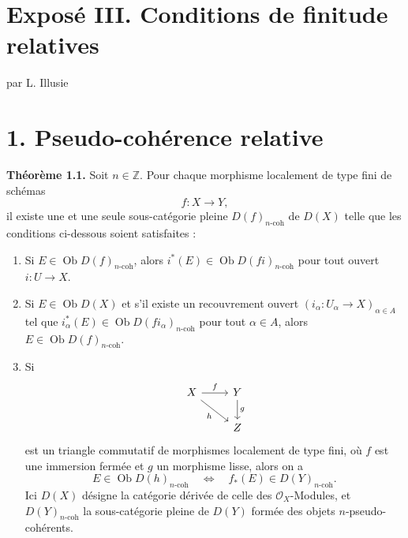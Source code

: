 \documentclass[11pt]{article}
\newcommand{\Spec}{\operatorname{Spec}}
\begin{document}
\providecommand{\Ob}{\operatorname{Ob}}
\providecommand{\qcoh}{\mathrm{qcoh}}
\providecommand{\coh}{\mathrm{coh}}
\providecommand{\torf}{\mathrm{torf}}
\providecommand{\toramp}{\operatorname{tor.amp}}
\providecommand{\amp}{\operatorname{amp}}
\providecommand{\Id}{\operatorname{Id}}
\providecommand{\pr}{\operatorname{pr}}
\providecommand{\coker}{\operatorname{coker}}
\providecommand{\im}{\operatorname{Im}}
\providecommand{\Spec}{\operatorname{Spec}}


\section*{Exposé III. Conditions de finitude relatives}
\begin{center}
par L. Illusie
\end{center}

\section*{1. Pseudo-cohérence relative}

\textbf{Théorème 1.1.} Soit \(n\in\mathbb Z\). Pour chaque morphisme localement de type fini de schémas
\[
  f:X\longrightarrow Y,
\]
il existe une et une seule sous-catégorie pleine \(D(f)_{n\text{-}\coh}\) de \(D(X)\) telle que les conditions ci-dessous soient satisfaites :
\begin{enumerate}[label=(\roman*)]
\item Si \(E\in\Ob D(f)_{n\text{-}\coh}\), alors \(i^*(E)\in\Ob D(fi)_{n\text{-}\coh}\) pour tout ouvert \(i:U\to X\).

\item Si \(E\in\Ob D(X)\) et s'il existe un recouvrement ouvert \((i_\alpha:U_\alpha\to X)_{\alpha\in A}\) tel que \(i_\alpha^*(E)\in\Ob D(fi_\alpha)_{n\text{-}\coh}\) pour tout \(\alpha\in A\), alors \(E\in\Ob D(f)_{n\text{-}\coh}\).

\item Si
\[
\begin{tikzcd}
X \arrow[r,"f"] \arrow[dr,"h"'] & Y \arrow[d,"g"]\\
& Z
\end{tikzcd}
\]
est un triangle commutatif de morphismes localement de type fini, où \(f\) est une immersion fermée et \(g\) un morphisme lisse, alors on a
\[
  E\in\Ob D(h)_{n\text{-}\coh}
  \quad\Longleftrightarrow\quad
  f_*(E)\in D(Y)_{n\text{-}\coh}.
\]
Ici \(D(X)\) désigne la catégorie dérivée de celle des \(\mathcal O_X\)-Modules, et \(D(Y)_{n\text{-}\coh}\) la sous-catégorie pleine de \(D(Y)\) formée des objets \(n\)-pseudo-cohérents.
\end{enumerate}
\end{document}

